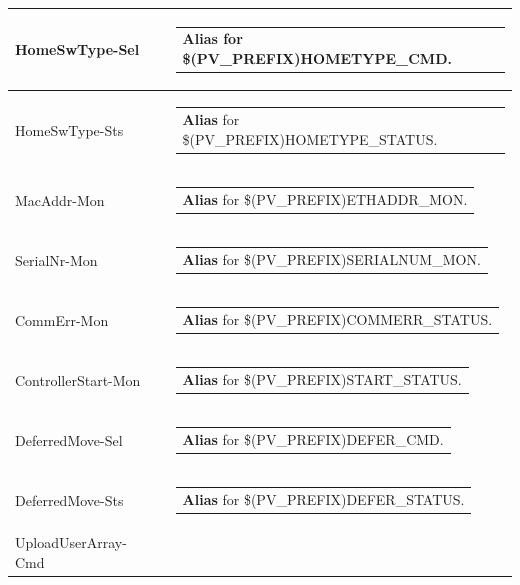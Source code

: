 \documentclass[openany]{article}
\begin{document}
\begin{longtable}{| m{4.5cm} m{2.5cm}  m{8.0cm} |}
        HomeSwType-Sel &  & \begin{tabular}{@{}m{6cm}@{}}
                \textbf{Alias} for \$(PV\_PREFIX)HOMETYPE\_CMD.
            \end{tabular} \hypertarget{}{}\\ \hline
        HomeSwType-Sts &  & \begin{tabular}{@{}m{6cm}@{}}
                \textbf{Alias} for \$(PV\_PREFIX)HOMETYPE\_STATUS.
            \end{tabular} \hypertarget{}{}\\ \hline
        MacAddr-Mon &  & \begin{tabular}{@{}m{6cm}@{}}
                \textbf{Alias} for \$(PV\_PREFIX)ETHADDR\_MON.
            \end{tabular} \hypertarget{}{}\\ \hline
        SerialNr-Mon &  & \begin{tabular}{@{}m{6cm}@{}}
                \textbf{Alias} for \$(PV\_PREFIX)SERIALNUM\_MON.
            \end{tabular} \hypertarget{}{}\\ \hline
        CommErr-Mon &  & \begin{tabular}{@{}m{6cm}@{}}
                \textbf{Alias} for \$(PV\_PREFIX)COMMERR\_STATUS.
            \end{tabular} \hypertarget{}{}\\ \hline
        ControllerStart-Mon &  & \begin{tabular}{@{}m{6cm}@{}}
                \textbf{Alias} for \$(PV\_PREFIX)START\_STATUS.
            \end{tabular} \hypertarget{}{}\\ \hline
        DeferredMove-Sel &  & \begin{tabular}{@{}m{6cm}@{}}
                \textbf{Alias} for \$(PV\_PREFIX)DEFER\_CMD.
            \end{tabular} \hypertarget{}{}\\ \hline
        DeferredMove-Sts &  & \begin{tabular}{@{}m{6cm}@{}}
                \textbf{Alias} for \$(PV\_PREFIX)DEFER\_STATUS.
            \end{tabular} \hypertarget{}{}\\ \hline
        UploadUserArray-Cmd &  & \begin{tabular}{@{}m{6cm}@{}}

\end{tabular}
\end{longtable}
\end{document}
